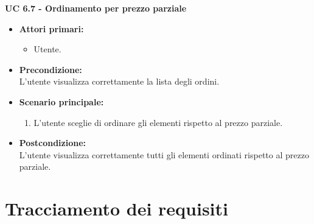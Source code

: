 \vspace{0.4cm}

\noindent \textbf{\large UC 6.7 - Ordinamento per prezzo parziale}
\label{uc:ordinamento-prezzo-parziale-ord}
\begin{itemize}

	\item \textbf{Attori primari: }
		\begin{itemize}
			\item Utente.
		\end{itemize}

	\item \textbf{Precondizione: }\\[0.3cm]
		L'utente visualizza correttamente la lista degli ordini.

	\item \textbf{Scenario principale: }
		\begin{enumerate}
			\item L'utente sceglie di ordinare gli elementi rispetto al prezzo parziale.
		\end{enumerate}
		

	\item \textbf{Postcondizione: }\\[0.3cm]
		L'utente visualizza correttamente tutti gli elementi ordinati rispetto al prezzo parziale.

\end{itemize}

\vspace{0.4cm}

\section{Tracciamento dei requisiti}

